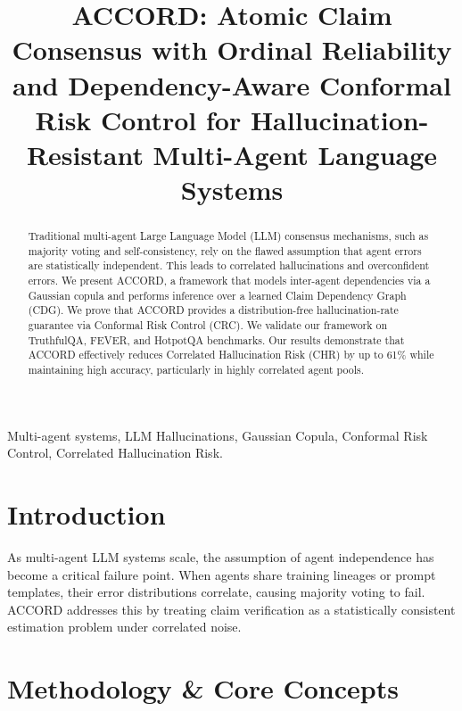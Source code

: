 \documentclass[conference]{IEEEtran}
\begin{document}
\title{ACCORD: Atomic Claim Consensus with Ordinal Reliability and Dependency-Aware Conformal Risk Control for Hallucination-Resistant Multi-Agent Language Systems}

\author{
}

\maketitle

\begin{abstract}
Traditional multi-agent Large Language Model (LLM) consensus mechanisms, such as majority voting and self-consistency, rely on the flawed assumption that agent errors are statistically independent. This leads to correlated hallucinations and overconfident errors. We present ACCORD, a framework that models inter-agent dependencies via a Gaussian copula and performs inference over a learned Claim Dependency Graph (CDG). We prove that ACCORD provides a distribution-free hallucination-rate guarantee via Conformal Risk Control (CRC). We validate our framework on TruthfulQA, FEVER, and HotpotQA benchmarks. Our results demonstrate that ACCORD effectively reduces Correlated Hallucination Risk (CHR) by up to 61\% while maintaining high accuracy, particularly in highly correlated agent pools.
\end{abstract}

\begin{IEEEkeywords}
Multi-agent systems, LLM Hallucinations, Gaussian Copula, Conformal Risk Control, Correlated Hallucination Risk.
\end{IEEEkeywords}

\section{Introduction}
As multi-agent LLM systems scale, the assumption of agent independence has become a critical failure point. When agents share training lineages or prompt templates, their error distributions correlate, causing majority voting to fail. ACCORD addresses this by treating claim verification as a statistically consistent estimation problem under correlated noise.

\section{Methodology & Core Concepts}
\end{document}
